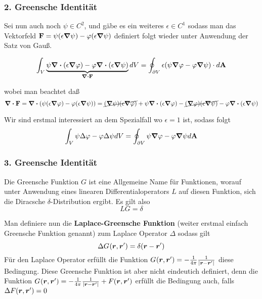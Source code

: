 \subsubsection{2. Greensche Identität}%
\label{ssub:green-id-2}
Sei nun auch noch $\psi\in C^2$, und gäbe es ein weiteres $\epsilon\in C^1$
sodass man das Vektorfeld 
$\vb F=\psi(\epsilon\grad\psi) - \varphi(\epsilon\grad\psi)$ 
definiert folgt wieder
unter Anwendung der Satz von Gauß.

\begin{equation}
  \int_V \underbrace{\psi\div(\epsilon\grad\varphi) - \varphi\div(\epsilon\grad\psi)}_{\div \vb F} dV
  = \oint_{\partial V} \epsilon (\psi \grad \varphi - \varphi \grad \psi) 
  \cdot d\vb A
\end{equation}

wobei man beachtet daß
\begin{equation*}
  \div \vb F = \div (\psi (\epsilon\grad\varphi) - \varphi(\epsilon\grad\psi))
  = \cancel{(\grad\psi)(\epsilon\grad\varphi)} 
  + \psi\div(\epsilon\grad\varphi)
  - \cancel{(\grad\varphi)(\epsilon\grad\psi)}
  - \varphi\div(\epsilon\grad\psi)
\end{equation*}

Wir sind erstmal interessiert an dem Spezialfall wo $\epsilon=1$ ist, sodass
folgt
\begin{equation}
  \int_V \psi\Delta\varphi - \varphi\Delta\psi dV= 
  \oint_{\partial V} \psi\grad\varphi - \varphi\grad\psi d\vb A
\end{equation}

\subsubsection{3. Greensche Identität}%
\label{ssub:green-id-3}

Die Greensche Funktion $G$ ist eine Allgemeine Name für Funktionen, worauf unter Anwendung eines linearen Differentialoperators $L$ auf diesen Funktion, sich die Diracsche $\delta$-Distribution ergibt. Es gilt also
\begin{equation}
  LG = \delta 
\end{equation}

Man definiere nun die \textbf{Laplace-Greensche Funktion} (weiter erstmal einfach Greensche Funktion genannt) zum Laplace Operator $\Delta$ sodass gilt
\begin{equation}
  \Delta G_{}(\vb*r,\vb*r')= \delta(\vb*r - \vb*r')
\end{equation}
Für den Laplace Operator erfüllt die Funktion 
$G_{}(\vb*r,\vb*r')=-\frac{1}{4\pi}\frac{1}{\abs{\vb*r-\vb*r'}}$ 
diese Bedingung. Diese 
Greensche Funktion ist aber nicht eindeutich definiert, denn die Funktion 
$G_{}(\vb*r,\vb*r')
=-\frac{1}{4\pi}\frac{1}{\abs{\vb*r-\vb*r'}} + F(\vb*r,\vb*r')$ erfüllt die
Bedingung auch, falls $\Delta F(\vb*r, \vb*r')=0$

